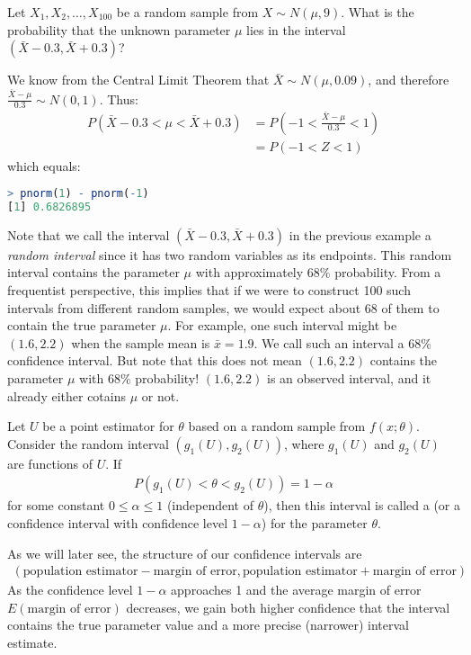 \begin{exmp}
    Let \( X_1, X_2, \ldots, X_100 \) be a random sample from \( X \sim N(\mu, 9) \).
    What is the probability that the unknown parameter \( \mu \) lies in the interval \( (\bar{X} - 0.3, \bar{X} + 0.3) \)?
\end{exmp}
\begin{solution}
    We know from the Central Limit Theorem that \( \bar{X} \sim N(\mu, 0.09) \),
    and therefore \( \frac{\bar{X} - \mu}{0.3} \sim N(0, 1) \). Thus:
    \begin{align*}
        P(\bar{X} - 0.3 < \mu < \bar{X} + 0.3) &= P(-1 < \frac{\bar{X} - \mu}{0.3} < 1)\\
        &= P(-1 < Z < 1)
    \end{align*}
    which equals:
    \begin{lstlisting}[language=R]
> pnorm(1) - pnorm(-1)
[1] 0.6826895
    \end{lstlisting}
\end{solution}
Note that we call the interval \( (\bar{X} - 0.3, \bar{X} + 0.3) \) in the previous example a \emph{random interval} since it has two random variables as its endpoints.
This random interval contains the parameter \( \mu \) with approximately 68\% probability.
From a frequentist perspective, this implies that if we were to construct 100 such intervals from different random samples, we would expect about 68 of them to contain the true parameter \( \mu \).
For example, one such interval might be \( (1.6, 2.2) \) when the sample mean is \( \bar{x} = 1.9 \).
We call such an interval a 68\% confidence interval.
But note that this does not mean \( (1.6, 2.2) \) contains the parameter \( \mu \) with 68\% probability!
\( (1.6, 2.2) \) is an observed interval, and it already either cotains \( \mu \) or not.

Let \( U \) be a point estimator for \( \theta \) based on a random sample from \( f(x; \theta) \).
Consider the random interval \( (g_1(U), g_2(U)) \), where \( g_1(U) \) and \( g_2(U) \) are functions of \( U \).
If
\begin{gather*}
    P(g_1(U) < \theta < g_2(U)) = 1 - \alpha
\end{gather*}
for some constant \( 0 \leq \alpha \leq 1 \) (independent of \( \theta \)),
then this interval is called a  (or a confidence interval with confidence level \( 1 - \alpha \)) for the parameter \( \theta \).

As we will later see, the structure of our confidence intervals are
\begin{gather*}
    (\text{population estimator} - \text{margin of error}, \text{population estimator} + \text{margin of error})
\end{gather*}
As the confidence level \( 1 - \alpha \) approaches 1 and the average margin of error \( E(\text{margin of error}) \) decreases,
we gain both higher confidence that the interval contains the true parameter value and a more precise (narrower) interval estimate.